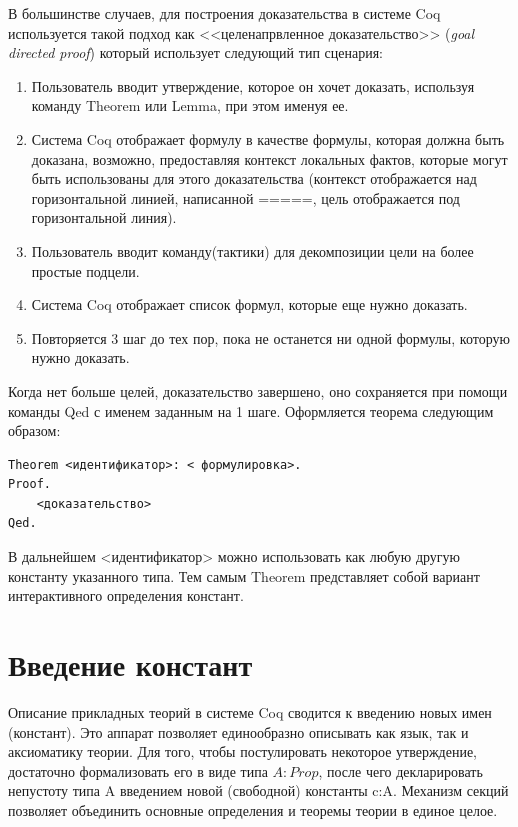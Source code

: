 В большинстве случаев, для построения доказательства в системе Coq 
используется такой подход как <<целенапрвленное доказательство>> (\textit{goal 
directed proof}) который использует следующий тип сценария\cite{bertot}:
\begin{enumerate}
	\item Пользователь вводит утверждение, которое он хочет доказать, используя 
команду Theorem или Lemma, при этом именуя ее.
\item Система Coq отображает формулу в качестве формулы, которая должна быть 
доказана, возможно, предоставляя контекст локальных фактов, которые могут 
быть использованы для этого доказательства (контекст отображается над 
горизонтальной линией, написанной =====, цель отображается под горизонтальной 
линия).
\item Пользователь вводит команду(тактики) для декомпозиции цели на более 
простые подцели.
\item Система Coq отображает список формул, которые еще нужно доказать.
\item Повторяется 3 шаг до тех пор, пока не останется ни одной формулы, 
которую нужно доказать.
\end{enumerate}

Когда нет больше целей, доказательство завершено, оно сохраняется при помощи 
команды Qed с именем заданным на 1 шаге.
Оформляется теорема следующим образом:

\begin{verbatim}
Theorem <идентификатор>: < формулировка>.
Proof.
	<доказательство>
Qed.
\end{verbatim}

В дальнейшем <идентификатор> можно использовать как любую другую константу 
указанного типа. Тем самым Theorem представляет собой вариант интерактивного 
определения констант\cite{bertot}.

\section{Введение констант}

Описание прикладных теорий в системе Coq сводится к введению новых
имен (констант). Это аппарат позволяет единообразно описывать как
язык, так и аксиоматику теории. Для того, чтобы постулировать некоторое 
утверждение, достаточно формализовать его в виде типа $A:Prop$,
после чего декларировать непустоту типа A введением новой (свободной)
константы c:A. Механизм секций позволяет объединить основные определения и 
теоремы теории в единое целое\cite{msu}.


